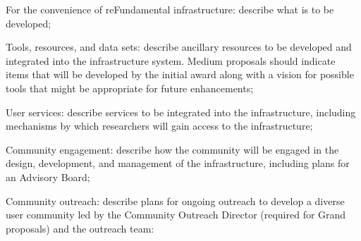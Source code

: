 For the convenience of reFundamental infrastructure: describe what is to be developed;

Tools, resources, and data sets: describe ancillary resources to be developed and integrated into the infrastructure system. Medium proposals should indicate items that will be developed by the initial award along with a vision for possible tools that might be appropriate for future enhancements;

User services: describe services to be integrated into the infrastructure, including mechanisms by which researchers will gain access to the infrastructure;

Community engagement: describe how the community will be engaged in the design, development, and management of the infrastructure, including plans for an Advisory Board;

Community outreach: describe plans for ongoing outreach to develop a diverse user community led by the Community Outreach Director (required for Grand proposals) and the outreach team: